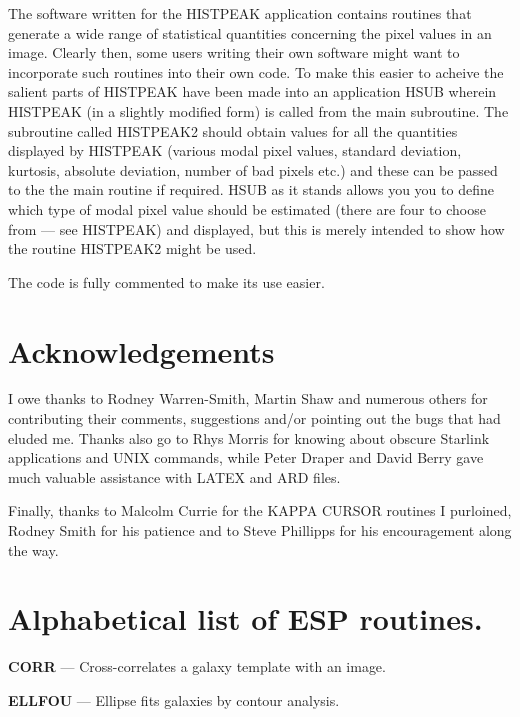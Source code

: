 \documentclass[twoside,11pt]{article}
\newcommand{\xref}[3]{#1}
\newcommand{\xlabel}[1]{}
\begin{document}
The software written for the HISTPEAK application contains routines that generate
a wide range of statistical quantities concerning the pixel values in
an image. Clearly then, some users writing their own software might want to
incorporate such routines into their own code. To make this easier to acheive
the salient parts of HISTPEAK have been made into an application HSUB wherein
HISTPEAK (in a slightly modified form) is called from the main subroutine.
The subroutine called HISTPEAK2 should obtain values for all the
quantities displayed by HISTPEAK (various modal pixel values, standard
deviation, kurtosis, absolute deviation, number of bad pixels etc.) and these
can be passed to the the main routine if required. HSUB as it stands allows you
you to define which type of modal pixel value should be estimated
(there are four to choose from --- see HISTPEAK) and displayed, but this
is merely intended to show how the routine HISTPEAK2 might be used.

The code is fully commented to make its use easier.


\section{Acknowledgements}
\label{sec:acknowledgements}

I owe thanks to Rodney Warren-Smith, Martin Shaw and numerous others for
contributing their comments, suggestions and/or pointing out the bugs that had
eluded me. Thanks also go to Rhys Morris for knowing about obscure Starlink
applications and UNIX commands, while Peter Draper  and David Berry gave
much valuable assistance with LATEX and ARD files.

Finally, thanks to Malcolm Currie for the \xref{KAPPA}{sun95}{} CURSOR routines I purloined,
Rodney Smith for his patience and to Steve Phillipps for his encouragement
along the way.

\newpage
\appendix

\newpage

\section{Alphabetical list of ESP routines.}
\xlabel{ALPHABETICAL}
\label{app:alphabetical}

%
%
{\bf CORR}{ --- Cross-correlates a galaxy template with an image.}
\pageref{des:CORR}

{\bf ELLFOU}{ --- Ellipse fits galaxies by contour analysis.}
\pageref{des:ELLFOU}
\end{document}
